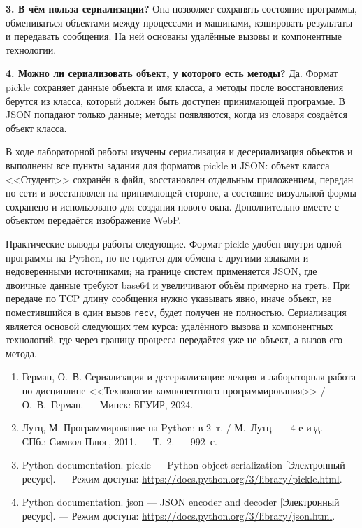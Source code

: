 \documentclass[14pt,a4paper]{extarticle}
\begin{document}
\textbf{3. В чём польза сериализации?} Она позволяет сохранять состояние программы,
обмениваться объектами между процессами и машинами, кэшировать результаты и передавать
сообщения. На ней основаны удалённые вызовы и компонентные технологии.

\textbf{4. Можно ли сериализовать объект, у которого есть методы?} Да. Формат pickle
сохраняет данные объекта и имя класса, а методы после восстановления берутся из
класса, который должен быть доступен принимающей программе. В JSON попадают только
данные; методы появляются, когда из словаря создаётся объект класса.


В ходе лабораторной работы изучены сериализация и десериализация объектов и выполнены
все пункты задания для форматов pickle и JSON: объект класса <<Студент>> сохранён в
файл, восстановлен отдельным приложением, передан по сети и восстановлен на принимающей
стороне, а состояние визуальной формы сохранено и использовано для создания нового
окна. Дополнительно вместе с объектом передаётся изображение WebP.

Практические выводы работы следующие. Формат pickle удобен внутри одной программы на
Python, но не годится для обмена с другими языками и недоверенными источниками; на
границе систем применяется JSON, где двоичные данные требуют base64 и увеличивают объём
примерно на треть. При передаче по TCP длину сообщения нужно указывать явно, иначе
объект, не поместившийся в один вызов \texttt{recv}, будет получен не полностью.
Сериализация является основой следующих тем курса: удалённого вызова и компонентных
технологий, где через границу процесса передаётся уже не объект, а вызов его метода.


\begin{enumerate}
\item Герман, О.~В. Сериализация и десериализация: лекция и лабораторная работа по
дисциплине <<Технологии компонентного программирования>> / О.~В.~Герман. --- Минск:
БГУИР, 2024.
\item Лутц, М. Программирование на Python: в 2~т. / М.~Лутц. --- 4-е изд. --- СПб.:
Символ-Плюс, 2011. --- Т.~2. --- 992~с.
\item Python documentation. pickle --- Python object serialization [Электронный
ресурс]. --- Режим доступа: \url{https://docs.python.org/3/library/pickle.html}.
\item Python documentation. json --- JSON encoder and decoder [Электронный ресурс]. ---
Режим доступа: \url{https://docs.python.org/3/library/json.html}.
\end{enumerate}
\end{document}
